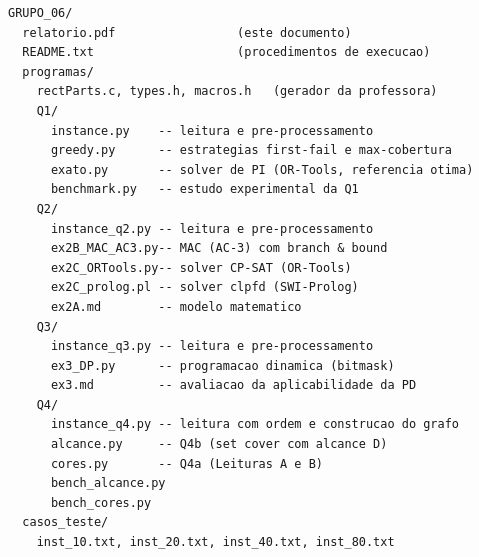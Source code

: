 \documentclass[11pt,a4paper]{article}
\begin{document}
\begin{lstlisting}
GRUPO_06/
  relatorio.pdf                 (este documento)
  README.txt                    (procedimentos de execucao)
  programas/
    rectParts.c, types.h, macros.h   (gerador da professora)
    Q1/
      instance.py    -- leitura e pre-processamento
      greedy.py      -- estrategias first-fail e max-cobertura
      exato.py       -- solver de PI (OR-Tools, referencia otima)
      benchmark.py   -- estudo experimental da Q1
    Q2/
      instance_q2.py -- leitura e pre-processamento
      ex2B_MAC_AC3.py-- MAC (AC-3) com branch & bound
      ex2C_ORTools.py-- solver CP-SAT (OR-Tools)
      ex2C_prolog.pl -- solver clpfd (SWI-Prolog)
      ex2A.md        -- modelo matematico
    Q3/
      instance_q3.py -- leitura e pre-processamento
      ex3_DP.py      -- programacao dinamica (bitmask)
      ex3.md         -- avaliacao da aplicabilidade da PD
    Q4/
      instance_q4.py -- leitura com ordem e construcao do grafo
      alcance.py     -- Q4b (set cover com alcance D)
      cores.py       -- Q4a (Leituras A e B)
      bench_alcance.py
      bench_cores.py
  casos_teste/
    inst_10.txt, inst_20.txt, inst_40.txt, inst_80.txt
\end{lstlisting}
\end{document}

